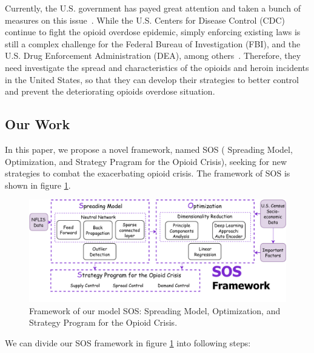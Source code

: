 \documentclass{mcmthesis}
\begin{document}
Currently, the U.S. government has payed great attention and taken a bunch of measures on this issue~\cite{CORRIGAN201844}. While the U.S. Centers for Disease Control (CDC) continue to fight the opioid overdose epidemic, simply enforcing existing laws is still a complex challenge for the Federal Bureau of Investigation (FBI), and the U.S. Drug Enforcement Administration (DEA), among others~\cite{intro}. Therefore, they need investigate the spread and characteristics of the opioids and heroin incidents in the United States, so that they can develop their strategies to better control and prevent the deteriorating opioids overdose situation.

\subsection{Our Work}
In this paper, we propose a novel framework, named SOS ( Spreading Model, Optimization, and Strategy Pragram for the Opioid Crisis), seeking for new strategies to combat the exacerbating opioid crisis. The framework of SOS is shown in figure \ref{Framework}. 

\begin{figure}[htbp]
	\centering 
	\includegraphics[width=1\linewidth]{../figure/framework2.pdf} 
	\caption{Framework of our model SOS: Spreading Model, Optimization, and Strategy Program for the Opioid Crisis.} 
	\label{Framework}  
\end{figure}


We can divide our SOS framework in figure  \ref{Framework}  into following steps:
\end{document}
